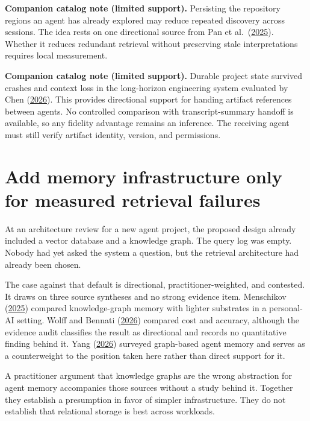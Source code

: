 \textbf{Companion catalog note (limited support).} Persisting the repository regions an agent has already explored may reduce repeated discovery across sessions. The idea rests on one directional source from Pan et al.~(\href{https://arxiv.org/abs/2507.19942}{2025}). Whether it reduces redundant retrieval without preserving stale interpretations requires local measurement.

\textbf{Companion catalog note (limited support).} Durable project state survived crashes and context loss in the long-horizon engineering system evaluated by Chen (\href{https://arxiv.org/abs/2604.13018}{2026}). This provides directional support for handing artifact references between agents. No controlled comparison with transcript-summary handoff is available, so any fidelity advantage remains an inference. The receiving agent must still verify artifact identity, version, and permissions.

\section{Add memory infrastructure only for measured retrieval failures}\label{add-memory-infrastructure-only-for-measured-retrieval-failures}

At an architecture review for a new agent project, the proposed design already included a vector database and a knowledge graph. The query log was empty. Nobody had yet asked the system a question, but the retrieval architecture had already been chosen.

The case against that default is directional, practitioner-weighted, and contested. It draws on three source syntheses and no strong evidence item. Menschikov (\href{https://arxiv.org/abs/2506.17001}{2025}) compared knowledge-graph memory with lighter substrates in a personal-AI setting. Wolff and Bennati (\href{https://arxiv.org/abs/2601.07978}{2026}) compared cost and accuracy, although the evidence audit classifies the result as directional and records no quantitative finding behind it. Yang (\href{https://arxiv.org/abs/2602.05665}{2026}) surveyed graph-based agent memory and serves as a counterweight to the position taken here rather than direct support for it.

A practitioner argument that knowledge graphs are the wrong abstraction for agent memory accompanies those sources without a study behind it. Together they establish a presumption in favor of simpler infrastructure. They do not establish that relational storage is best across workloads.


